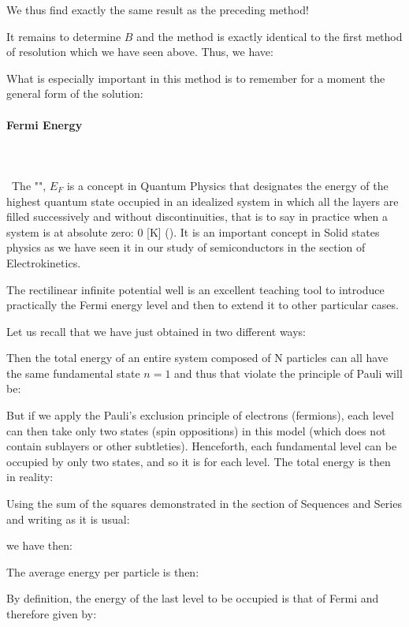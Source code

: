 	We thus find exactly the same result as the preceding method!

	It remains to determine $B$ and the method is exactly identical to the first method of resolution which we have seen above. Thus, we have:
	
	What is especially important in this method is to remember for a moment the general form of the solution:
	
	
	\pagebreak
	\paragraph{Fermi Energy}\mbox{}\\\\\
	The "\label{fermi energy}", $E_F$ is a concept in Quantum Physics that designates the energy of the highest quantum state occupied in an idealized system in which all the layers are filled successively and without discontinuities, that is to say in practice when a system is at absolute zero: $0$ [K] (). It is an important concept in Solid states physics as we have seen it in our study of semiconductors in the section of Electrokinetics.
	
	The rectilinear infinite potential well is an excellent teaching tool to introduce practically the Fermi energy level and then to extend it to other particular cases.

	Let us recall that we have just obtained in two different ways:
	
	Then the total energy of an entire system composed of N particles can all have the same fundamental state $n = 1$ and thus that violate the principle of Pauli will be:
	
	But if we apply the Pauli's exclusion principle of electrons (fermions), each level can then take only two states (spin oppositions) in this model (which does not contain sublayers or other subtleties). Henceforth, each fundamental level can be occupied by only two states, and so it is for each level. The total energy is then in reality:
	
	Using the sum of the squares demonstrated in the section of Sequences and Series and writing as it is usual:
	
	we have then:
	
	The average energy per particle is then:
	
	By definition, the energy of the last level to be occupied is that of Fermi and therefore given by:
	
